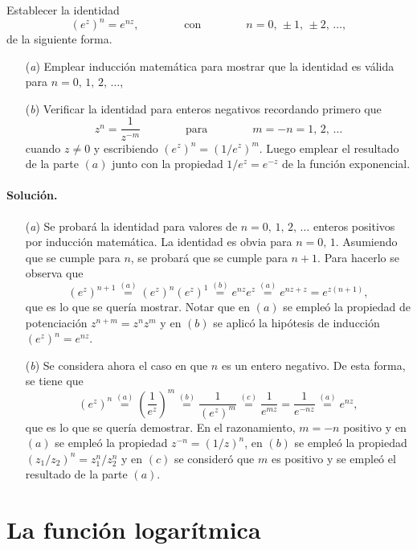 \documentclass[a4paper]{report}
\begin{document}
Establecer la identidad
\[
 (e^z)^n=e^{nz},
 \qquad\qquad\textrm{con}\qquad\qquad
 n=0,\,\pm1,\,\pm2,\,\dots,
\]
de la siguiente forma.
\begin{enumerate}
 \item[(\textit{a})] Emplear inducción matemática para mostrar que la identidad es válida para \(n=0,\,1,\,2,\,\dots\),
 \item[(\textit{b})] Verificar la identidad para enteros negativos recordando primero que 
 \[
  z^n=\frac{1}{z^{-m}}
  \qquad\qquad\textrm{para}\qquad\qquad
 m=-n=1,\,2,\,\dots
 \]
 cuando \(z\neq0\) y escribiendo \((e^z)^n=(1/e^z)^m\). Luego emplear el resultado de la parte \((a)\) junto con la propiedad \(1/e^z=e^{-z}\) de la función exponencial.
\end{enumerate}

\paragraph{Solución.} 

\begin{enumerate}
 \item[(\textit{a})] Se probará la identidad para valores de \(n=0,\,1,\,2,\,\dots\) enteros positivos por inducción matemática. La identidad es obvia para \(n=0,\,1\). Asumiendo que se cumple para \(n\), se probará que se cumple para \(n+1\). Para hacerlo se observa que 
 \[
  (e^z)^{n+1}\overset{(a)}{=}(e^z)^n(e^z)^1\overset{(b)}{=}e^{nz}e^z\overset{(a)}{=}e^{nz+z}=e^{z(n+1)},
 \]
 que es lo que se  quería mostrar. Notar que en \((a)\) se empleó la propiedad de potenciación \(z^{n+m}=z^nz^m\) y en \((b)\) se aplicó la hipótesis de inducción \((e^z)^n=e^{nz}\).
 \item[(\textit{b})] Se considera ahora el caso en que \(n\) es un entero negativo. De esta forma, se tiene que 
 \[
  (e^z)^n\overset{(a)}{=}\left(\frac{1}{e^z}\right)^m\overset{(b)}{=}\frac{1}{(e^z)^m}
  \overset{(c)}{=}\frac{1}{e^{mz}}=\frac{1}{e^{-nz}}\overset{(a)}{=}e^{nz},
 \]
 que es lo que se quería demostrar. En el razonamiento, \(m=-n\) positivo y en \((a)\) se empleó la propiedad \(z^{-n}=(1/z)^n\), en \((b)\) se empleó la propiedad \((z_1/z_2)^n=z_1^n/z_2^n\) y en \((c)\) se consideró que \(m\) es positivo y se empleó el resultado de la parte \((a)\).
\end{enumerate}

\section{La función logarítmica}\label{sec:logarithm_function}
\end{document}

